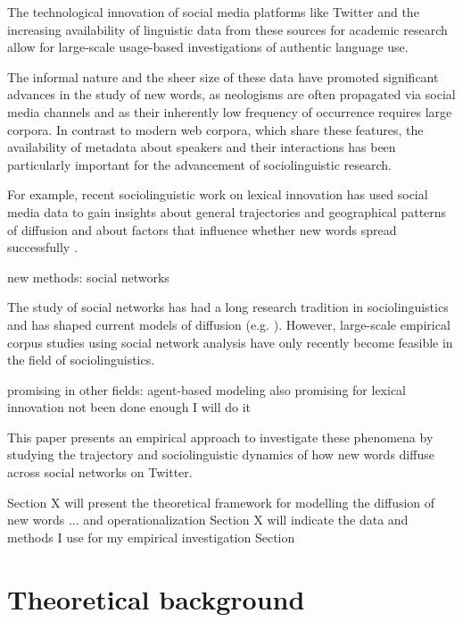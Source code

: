 \documentclass[
  a4paper,
  ]{scrartcl}
\begin{document}
  The technological innovation of social media platforms like Twitter and the increasing availability of linguistic data from these sources for academic research allow for large-scale usage-based investigations of authentic language use.

  The informal nature and the sheer size of these data have promoted significant advances in the study of new words, as neologisms are often propagated via social media channels and as their inherently low frequency of occurrence requires large corpora. In contrast to modern web corpora, which share these features, the availability of metadata about speakers and their interactions has been particularly important for the advancement of sociolinguistic research.

  For example, recent sociolinguistic work on lexical innovation has used social media data to gain insights about general trajectories \parencite{Nini2017} and geographical patterns \parencite{Eisenstein2014,Grieve2017,Grieve2018} of diffusion and about factors that influence whether new words spread successfully \parencite{Grieveforthcoming}.

  new methods: social networks

    The study of social networks has had a long research tradition in sociolinguistics and has shaped current models of diffusion (e.g. \cite{Milroy1985}). However, large-scale empirical corpus studies using social network analysis have only recently become feasible in the field of sociolinguistics.

      promising in other fields: agent-based modeling
      also promising for lexical innovation
      not been done enough
      I will do it


  This paper presents an empirical approach to investigate these phenomena by studying the trajectory and sociolinguistic dynamics of how new words diffuse across social networks on Twitter.

  Section X will present the theoretical framework for modelling the diffusion of new words ... and operationalization
  Section X will indicate the data and methods I use for my empirical investigation
  Section

\section{Theoretical background}
\end{document}
